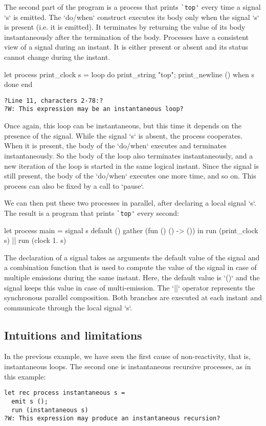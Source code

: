 \documentclass[9pt,preprint]{sigplanconf}
\begin{document}
The second part of the program is a process that prints \verb+`top'+ every time a signal `s` is emitted. 
The `do/when` construct executes its body only when the signal `s` is present (i.e. it is emitted). It terminates by returning the value of its body instantaneously after the termination of the body. Processes have a consistent view of a signal during an instant. It is either present or absent and its status cannot change during the instant.
%
\begin{rmlcl}[10]
let process print_clock s =
  loop
    do
      print_string "top"; print_newline ()
    when s done
  end
\end{rmlcl}
\begin{lstlisting}
?Line 11, characters 2-78:?
?W: This expression may be an instantaneous loop?
\end{lstlisting}
%
Once again, this loop can be instantaneous, but this time it depends on the presence of the signal. While the signal `s` is absent, the process cooperates. When it is present, the body of the `do/when` executes and terminates instantaneously. So the body of the loop also terminates instantaneously, and a new iteration of the loop is started in the same logical instant. Since the signal is still present, the body of the `do/when` executes one more time, and so on. This process can also be fixed by a call to `pause`.

We can then put these two processes in parallel, after declaring a local signal `s`. The result is a program that prints \verb+`top'+ every second:
\begin{rmlcl}[18]
let process main =
  signal s default () gather (fun () () -> ()) in
  run (print_clock s) || run (clock 1. s)
\end{rmlcl}
The declaration of a signal takes as arguments the default value of the signal and a combination function that is used to compute the value of the signal in case of multiple emissions during the same instant. Here, the default value is `()` and the signal keeps this value in case of multi-emission. The `||` operator represents the synchronous parallel composition. Both branches are executed at each instant and communicate through the local signal `s`.

\subsection{Intuitions and limitations}
\label{sec:intuition}

In the previous example, we have seen the first cause of non-reactivity, that is, instantaneous loops. The second one is instantaneous recursive processes, as in this example:
\begin{lstlisting}
let rec process instantaneous s =
  emit s ();
  run (instantaneous s)
?W: This expression may produce an instantaneous recursion?
\end{lstlisting}
\end{document}
